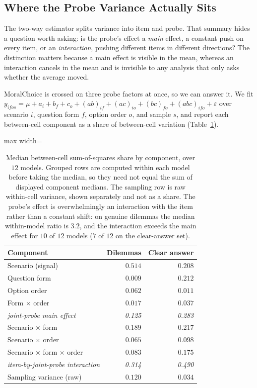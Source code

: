 \documentclass[11pt]{article}
\begin{document}
\subsection{Where the Probe Variance Actually Sits}
\label{app:components}

The two-way estimator splits variance into item and probe. That summary hides a
question worth asking: is the probe's effect a \emph{main} effect, a constant
push on every item, or an \emph{interaction}, pushing different items in
different directions? The distinction matters because a main effect is visible
in the mean, whereas an interaction cancels in the mean and is invisible to any
analysis that only asks whether the average moved.

MoralChoice is crossed on three probe factors at once, so we can answer it. We
fit
$y_{ifos}=\mu+a_i+b_f+c_o+(ab)_{if}+(ac)_{io}+(bc)_{fo}
+(abc)_{ifo}+\varepsilon$
over scenario $i$, question form $f$, option order $o$, and sample $s$, and
report each between-cell component as a share of between-cell variation
(Table~\ref{tab:components}).

\begin{table}[t]
\centering
\small
\setlength{\tabcolsep}{4pt}
\renewcommand{\arraystretch}{1.1}
\begin{adjustbox}{max width=\columnwidth}
\begin{tabular}{@{}l r r@{}}
\toprule
\textbf{Component} & \textbf{Dilemmas} & \textbf{Clear answer} \\
\midrule
Scenario (signal)            & $0.514$ & $0.208$ \\
\midrule
Question form                & $0.009$ & $0.212$ \\
Option order                 & $0.062$ & $0.011$ \\
Form $\times$ order          & $0.017$ & $0.037$ \\
\emph{joint-probe main effect} & \emph{0.125} & \emph{0.283} \\
\midrule
Scenario $\times$ form       & $0.189$ & $0.217$ \\
Scenario $\times$ order      & $0.065$ & $0.098$ \\
Scenario $\times$ form $\times$ order & $0.083$ & $0.175$ \\
\emph{item-by-joint-probe interaction} & \emph{0.314} & \emph{0.490} \\
\midrule
Sampling variance (raw)      & $0.120$ & $0.034$ \\
\bottomrule
\end{tabular}
\end{adjustbox}
\caption{Median between-cell sum-of-squares share by component, over $12$
models. Grouped rows are computed within each model before taking the median,
so they need not equal the sum of displayed component medians. The sampling row
is raw within-cell variance, shown separately and not as a share. The probe's
effect is overwhelmingly an interaction with the item rather than a constant
shift: on genuine dilemmas the median within-model ratio is $3.2$, and the
interaction exceeds the main effect for $10$ of $12$ models ($7$ of $12$ on
the clear-answer set).}
\label{tab:components}
\end{table}
\end{document}
